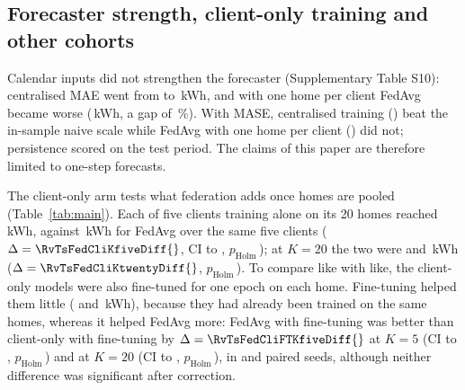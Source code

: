 \subsection{Forecaster strength, client-only training and other cohorts}
Calendar inputs did not strengthen the forecaster (Supplementary Table S10): centralised MAE went from
\EtwocentralizedMAE{} to \RvCalCentralisedmaecal{}\,kWh, and with one home per client FedAvg became worse
(\RvCalFedonezerozeromaecal{}\,kWh, a gap of \RvCalFedonezerozeroGapCal{}\,\%). With MASE, centralised training
(\RvCalCentralisedmase{}) beat the in-sample naive scale while FedAvg with one home per client (\RvCalFedonezerozeromase{})
did not; persistence scored \RvMASEPersistence{} on the test period. The claims of this paper are therefore limited to
one-step forecasts.

The client-only arm tests what federation adds once homes are pooled (Table~\ref{tab:main}). Each of five clients
training alone on its 20 homes reached \RvCliFTKfiveMAE{}\,kWh, against \EonefourfedavgKfiveMAE{}\,kWh for FedAvg over
the same five clients ($\Delta=\RvTsFedCliKfiveDiff{}$, CI \RvTsFedCliKfiveLo{} to \RvTsFedCliKfiveHi{},
$p_{\mathrm{Holm}}$\,\RvTsFedCliKfiveP{}); at $K=20$ the two were \RvCliFTKtwentyMAE{} and \EthreefedavgiidMAE{}\,kWh
($\Delta=\RvTsFedCliKtwentyDiff{}$, $p_{\mathrm{Holm}}$\,\RvTsFedCliKtwentyP{}). To compare like with like, the
client-only models were also fine-tuned for one epoch on each home. Fine-tuning helped them little (\RvCliFTKfiveFT{}
and \RvCliFTKtwentyFT{}\,kWh), because they had already been trained on the same homes, whereas it helped FedAvg more:
FedAvg with fine-tuning was better than client-only with fine-tuning by $\Delta=\RvTsFedCliFTKfiveDiff{}$ at $K=5$ (CI
\RvTsFedCliFTKfiveLo{} to \RvTsFedCliFTKfiveHi{}, $p_{\mathrm{Holm}}$\,\RvTsFedCliFTKfiveP{}) and
\RvTsFedCliFTKtwentyDiff{} at $K=20$ (CI \RvTsFedCliFTKtwentyLo{} to \RvTsFedCliFTKtwentyHi{},
$p_{\mathrm{Holm}}$\,\RvTsFedCliFTKtwentyP{}), in \RvTsFedCliFTKfiveSeeds{} and \RvTsFedCliFTKtwentySeeds{} paired seeds,
although neither difference was significant after correction.

\begin{table}
\caption{Gap to centralised training (\%) in three cohorts of 100 homes, FedAvg after 30 rounds, homes grouped at random
and windows dealt at random (IID control). Each cohort is compared with its own centralised arm. Main cohort: all seeds
of Table~\ref{tab:frag}; second and third cohorts: two seeds.}\label{tab:cohorts}

\end{table}

